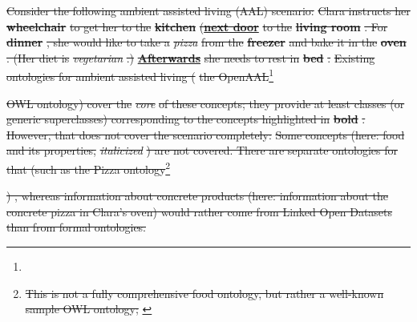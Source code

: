 \documentclass[10pt,fleqn,final]{scrreprt}
\makeatletter
\newcommand*{\cf}{cf.\@\xspace}
\newcommand*{\eg}{e.g.\@\xspace}
\newcommand*{\DOL}{\ensuremath{\mathsf{DOL}}\xspace}
\providecommand{\DIFdel}[1]{{\protect\color{red}\sout{#1}}}                      %
\makeatother
\begin{document}
\DIFdel{Consider the following ambient assisted living (AAL) scenario:
  }%
\DIFdel{Clara instructs her }\textbf{\DIFdel{wheelchair}} %
\DIFdel{to get her to the }\textbf{\DIFdel{kitchen}} %
\DIFdel{(}\textbf{\underline{\DIFdel{next door}}%
} %
\DIFdel{to the }\textbf{\DIFdel{living room}}%
\DIFdel{.  For }\textbf{\DIFdel{dinner}}%
\DIFdel{, she would like to take a }\textit{\DIFdel{pizza}} %
\DIFdel{from the }\textbf{\DIFdel{freezer}} %
\DIFdel{and bake it in the }\textbf{\DIFdel{oven}}%
\DIFdel{.  (Her diet is }\textit{\DIFdel{vegetarian}}%
\DIFdel{.)             }\textbf{\underline{\DIFdel{Afterwards}}%
} %
\DIFdel{she needs to rest in }\textbf{\DIFdel{bed}}%
\DIFdel{. }%
\DIFdel{Existing ontologies for ambient assisted living (}%
\DIFdel{the OpenAAL}\footnote{%
} %
\addtocounter{footnote}{-1}%
\DIFdel{OWL ontology) cover the }\emph{\DIFdel{core}} %
\DIFdel{of these  concepts; they provide at least classes (or generic superclasses) corresponding to the concepts highlighted in }\textbf{\DIFdel{bold}}%
\DIFdel{.  However, that does not cover the scenario completely:
  }%
\DIFdel{Some concepts (here: food and its properties, }\textit{\DIFdel{italicized}}%
\DIFdel{)             are not covered. There are separate ontologies for that (such as the Pizza ontology}\footnote{\DIFdel{This is not a fully comprehensive food ontology, but rather a well-known sample OWL ontology; }%
}%
\addtocounter{footnote}{-1}%
\DIFdel{) , whereas information about concrete products (here: information about the concrete pizza in Clara's oven) would rather come from Linked Open Datasets than from formal ontologies. }%
\end{document}
